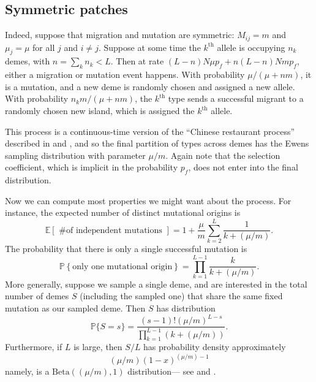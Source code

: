 \documentclass{article}
\renewcommand{\P}{\mathbb{P}}
\newcommand{\E}{\mathbb{E}}
\begin{document}
\subsection{Symmetric patches}

Indeed, suppose that migration and mutation are symmetric: $M_{ij}=m$ and $\mu_j = \mu$ for all $j$ and $i\neq j$.
Suppose at some time the $k^\mathrm{th}$ allele is occupying $n_k$ demes, 
with $n = \sum_k n_k < L$.
Then at rate $(L-n) N \mu p_f + n (L-n) N m p_f$,
either a migration or mutation event happens.
With probability $\mu/(\mu + n m)$, it is a mutation,
and a new deme is randomly chosen and assigned a new allele.
With probability $n_k m / (\mu + n m)$,
the $k^\mathrm{th}$ type sends a successful migrant to a randomly chosen new island,
which is assigned the $k^\mathrm{th}$ allele.

This process is a continuous-time version of the ``Chinese restaurant process''
described in \citet{aldous1985exchangeability} and \citet{pitman1995partitions},
and so the final partition of types across demes has the Ewens sampling distribution with parameter $\mu/m$.
Again note that the selection coefficient, which is implicit in the probability $p_f$,
does not enter into the final distribution.

Now we can compute most properties we might want about the process.
For instance, the expected number of distinct mutational origins is
\begin{equation}
    \E\left[ \mbox{ \# of independent mutations } \right] = 
            1 + \frac{\mu}{m} \sum_{k=2}^L \frac{1}{k+(\mu/m)}. \label{discrete_expected}
\end{equation}
The probability that there is only a single successful mutation is
\begin{equation}
\P \left\{ \mbox{only one mutational origin} \right\} = 
            \prod_{k=1}^{L-1} \frac{ k }{ k+(\mu/m)} .
\end{equation}
More generally, suppose we sample a single deme, and are interested in the total number of demes $S$
(including the sampled one) that share the same fixed mutation as our sampled deme.
Then $S$ has distribution
\begin{equation} \label{eqn:Sdistrn}
\P\{ S=s \} = \frac{ (s-1)! (\mu/m)^{L-s} }{ \prod_{k=1}^{L-1} (k+(\mu/m)) } .
\end{equation}
Furthermore, if $L$ is large, then $S/L$ has probability density approximately
\begin{equation} \label{eqn:betadistrn}
   (\mu/m) (1-x)^{(\mu/m)-1}
\end{equation}
namely, is a $\mathrm{Beta}((\mu/m), 1)$ distribution--- see \cite{donnelly-joyce} and \cite{permanPitmanYor92}.
\end{document}
